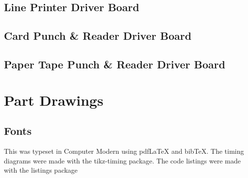 \documentclass{book}
\begin{document}
\section{Line Printer Driver Board}
\cleardoublepage
\section{Card Punch \& Reader Driver Board}
\cleardoublepage
\section{Paper Tape Punch \& Reader Driver Board}
\chapter{Part Drawings}
\backmatter


\cleardoublepage
\section*{Fonts}
This was typeset in Computer Modern using pdf\LaTeX{} and bib\TeX{}.
The timing diagrams were made with the tikz-timing package.
The code listings were made with the listings package
\end{document}
